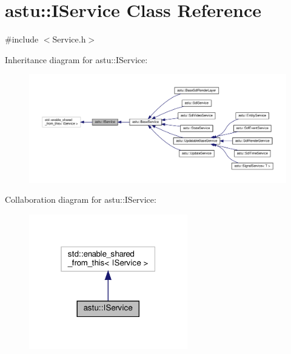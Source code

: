\hypertarget{classastu_1_1IService}{}\section{astu\+:\+:I\+Service Class Reference}
\label{classastu_1_1IService}


{\ttfamily \#include $<$Service.\+h$>$}



Inheritance diagram for astu\+:\+:I\+Service\+:\nopagebreak
\begin{figure}[H]
\begin{center}
\leavevmode
\includegraphics[width=350pt]{classastu_1_1IService__inherit__graph}
\end{center}
\end{figure}


Collaboration diagram for astu\+:\+:I\+Service\+:\nopagebreak
\begin{figure}[H]
\begin{center}
\leavevmode
\includegraphics[width=196pt]{classastu_1_1IService__coll__graph}
\end{center}
\end{figure}
